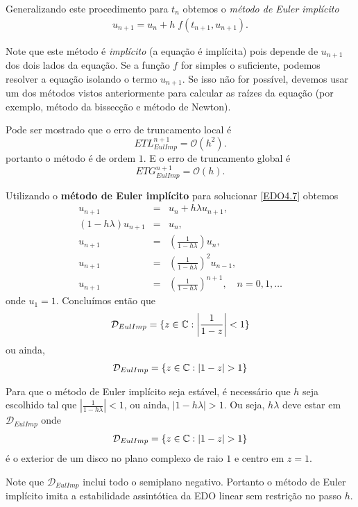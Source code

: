 Generalizando este procedimento para $t_n$ obtemos o \emph{método de Euler implícito}
\begin{eqnarray}
u_{n+1}=u_n + h\;f(t_{n+1},u_{n+1}).
\end{eqnarray}

Note que este método é \emph{implícito} (a equação é implícita) pois depende de $u_{n+1}$ dos dois lados da equação. Se a função $f$ for simples o suficiente, podemos resolver a equação isolando o termo $u_{n+1}$. Se isso não for possível, devemos usar um dos métodos vistos anteriormente para calcular as raízes da equação (por exemplo, método da bissecção e método de Newton).



Pode ser mostrado que o erro de truncamento local é
$$ETL_{EulImp}^{n+1}= \mathcal{O}(h^2).$$
portanto o método é de ordem $1$. E o erro de truncamento global é
$$ETG_{EulImp}^{n+1}= \mathcal{O}(h).$$



\begin{ex}
Utilizando o \textbf{método de Euler implícito} para solucionar \eqref{EDO4.7} obtemos
\begin{eqnarray}
 u_{n+1}      &=& u_n+h\lambda u_{n+1}, \\
 (1-h\lambda )u_{n+1} & =& u_n, \\
       u_{n+1} & =& \left(\frac{1}{1- h\lambda }\right)u_n, \\
       u_{n+1} & =& \left(\frac{1}{1- h\lambda }\right)^2u_{n-1}, \\
       u_{n+1} & =& \left(\frac{1}{1- h\lambda }\right)^{n+1}, \quad  n=0,1,\ldots
\end{eqnarray}
onde $u_1=1$.
Concluímos então que
\begin{eqnarray}
 \mathcal D_{EulImp} = \{z \in  \mathbb{C}:  \left|\frac{1}{1- z}\right|<1\}
\end{eqnarray}
ou ainda,
\begin{eqnarray}
 \mathcal D_{EulImp} = \{z \in  \field{C}:  |1- z|>1\}
\end{eqnarray}

Para que o método de Euler implícito seja estável, é necessário que $h$ seja escolhido tal que $\left|\frac{1}{1- h\lambda }\right|<1$, ou ainda, $|1-h\lambda |>1$. Ou seja, $h\lambda $ deve estar em $\mathcal D_{EulImp}$ onde
\begin{eqnarray}
 \mathcal D_{EulImp} = \{z \in  \field{C}: |1-z|>1\}
\end{eqnarray}
é o exterior de um disco no plano complexo de raio $1$ e centro em $z=1$.

Note que $\mathcal D_{EulImp}$ inclui todo o semiplano negativo. Portanto o método de Euler implícito imita a estabilidade assintótica da EDO linear sem restrição no passo $h$.

\end{ex}

